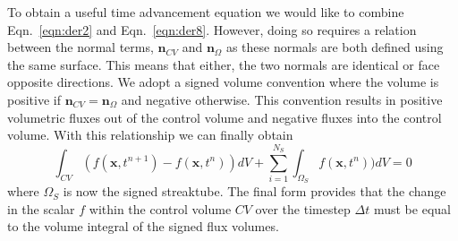 To obtain a useful time advancement equation we would like to combine Eqn.~\ref{eqn:der2} and Eqn.~\ref{eqn:der8}. However, doing so requires a relation between the normal terms, $\bm{n}_{CV}$ and $\bm{n}_{\Omega}$ as these normals are both defined using the same surface. This means that either, the two normals are identical or face opposite directions. We adopt a signed volume convention where the volume is positive if $\bm{n}_{CV} = \bm{n}_{\Omega}$ and negative otherwise. This convention results in positive volumetric fluxes out of the control volume and negative fluxes into the control volume. With this relationship we can finally obtain 
\begin{equation}
\int_{CV} (f (\bm{x} , t^{n+1}) - f (\bm{x} , t^{n}) )dV + \sum_{i=1}^{N_S}\int_{\Omega_S} f (\bm{x} , t^{n}) )dV =0
\label{eqn:derFinal}
\end{equation}
where $\Omega_S$ is now the signed streaktube. The final form provides that the change in the scalar $f$  within the control volume $CV$ over the timestep $\Delta t$ must be equal to the volume integral of the signed flux volumes. 

